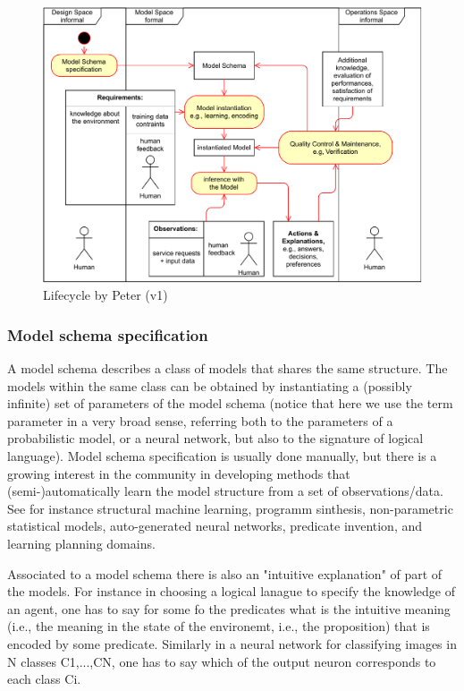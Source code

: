 \begin{figure}
    \centering
    \includegraphics[width=\linewidth]{HCAI-lifecycle-v1}
    \caption{Lifecycle by Peter (v1)}
    \label{fig:peterlifecycle}
\end{figure}

\subsubsection{Model schema specification}

A model schema describes a class of models that shares the same structure. The models within the same class can be obtained by instantiating a (possibly infinite) set of parameters of the model schema (notice that here we use the term parameter in a very broad sense, referring both to the parameters of a probabilistic model, or a neural network, but also to the signature of logical language). Model schema specification is usually done manually, but there is a growing interest in the community in developing methods that (semi-)automatically learn the model structure from a set of observations/data. See for instance structural machine learning, programm sinthesis, non-parametric statistical models, auto-generated neural networks, predicate invention, and learning planning domains.

Associated to a model schema there is also an "intuitive explanation" of part of the models. For instance in choosing a logical lanague to specify the knowledge of an agent, one has to say for some fo the predicates what is the intuitive meaning (i.e., the meaning in the state of the environemt, i.e., the proposition) that is encoded by some predicate. Similarly in a neural network for classifying images in N classes C1,...,CN, one has to say which of the output neuron corresponds to each class Ci.

